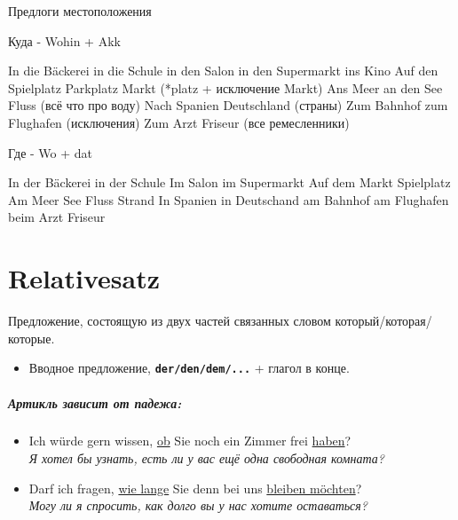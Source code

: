 \documentclass[12pt]{report}
\newcommand{\term}[1]{\texttt{\textbf{#1}}}
\newcommand{\satzew}[1]{\underline{#1}}
\newcommand{\ubersatze}[1]{\textit{#1}}
\begin{document}
Предлоги местоположения

Куда - Wohin + Akk

In die Bäckerei in die Schule in den Salon in den Supermarkt ins Kino 
Auf den Spielplatz Parkplatz Markt (*platz + исключение Markt)
Ans Meer an den See Fluss (всё что про воду)
Nach Spanien Deutschland (страны)
Zum Bahnhof zum Flughafen (исключения)
Zum Arzt Friseur (все ремесленники)

Где - Wo + dat

In der Bäckerei in der Schule Im Salon im Supermarkt 
Auf dem Markt  Spielplatz
Am Meer See Fluss Strand
In Spanien in Deutschand
am Bahnhof am Flughafen
beim  Arzt Friseur

\chapter{Relativesatz}

Предложение, состоящую из двух частей связанных словом который/которая/которые. 

\begin{itemize}
 \item Вводное предложение, \term{der/den/dem/...} + глагол в конце.
\end{itemize}

\paragraph{Артикль зависит от падежа:}
\begin{itemize}
 \item Ich würde gern wissen, \satzew{ob} Sie noch ein Zimmer frei \satzew{haben}? 
 ~\\ \ubersatze{Я хотел бы узнать, есть ли у вас ещё одна свободная комната?}
 \item Darf ich fragen, \satzew{wie lange} Sie denn bei uns \satzew{bleiben möchten}? 
 ~\\ \ubersatze{Могу ли я спросить, как долго вы у нас хотите оставаться?}
\end{itemize}
\end{document}
